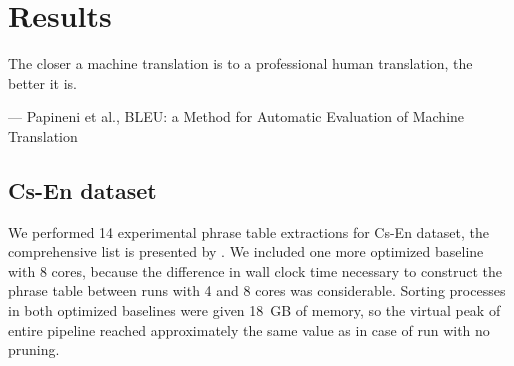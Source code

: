 \chapter{Results}
\label{chap:results}

\setlength{\epigraphwidth}{1.0\textwidth}
\epigraph{The closer a machine translation is to a professional human translation, the better it is.}{--- Papineni et al., BLEU: a Method for Automatic Evaluation of Machine Translation}


\section{Cs-En dataset}
\label{sec:cs-en-results}

We performed 14 experimental phrase table extractions for Cs-En dataset,
the comprehensive list is presented by .
We included one more optimized baseline with 8 cores, because the difference in
wall clock time necessary to construct the phrase table between runs with 4 and 8 cores
was considerable.
Sorting processes in both optimized baselines were given 18~GB of memory, so the virtual
peak of entire pipeline reached approximately the same value as in case of \eppex{}
run with no pruning.

